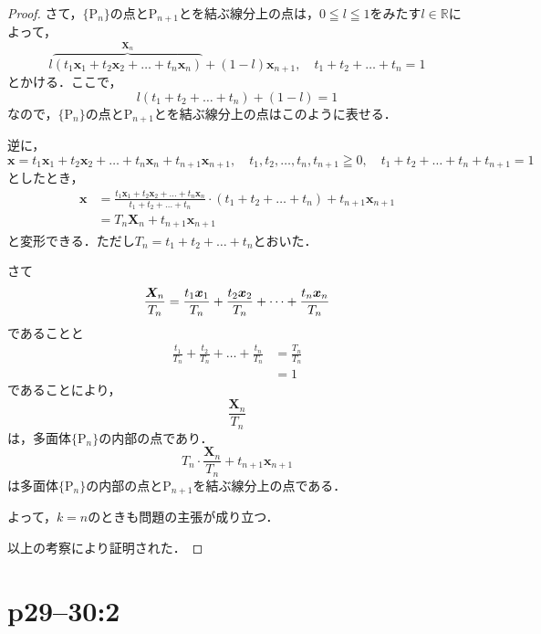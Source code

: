 \documentclass[a4paper,10pt,fleqn]{ltjsarticle}
\begin{document}
\begin{leftbar}
\begin{proof}
    さて，$\{ \mathrm{P}_n \}$の点と$\mathrm{P}_{n+1}$とを結ぶ線分上の点は，$ 0 \leqq l \leqq 1$をみたす$l \in \mathbb{R}$によって，
    \[
      l \overbrace{(  t_1 \bm{x}_1 + t_2 \bm{x}_2+\dots+ t_n \bm{x}_n)}^{\bm{X}_n}+(1-l) \bm{x}_{n+1} , \quad t_1+t_2+\dots + t_n =1
    \]
    とかける．ここで，
    \[
      l(t_1+t_2+\dots+t_n)+(1-l)=1
    \]
    なので，$\{ \mathrm{P}_n \}$の点と$\mathrm{P}_{n+1}$とを結ぶ線分上の点はこのように表せる．

    逆に，
    \[
      \bm{x} = t_1 \bm{x}_1 + t_2 \bm{x}_2 + \dots + t_n \bm{x}_n + t_{n+1} \bm{x}_{n+1} , \quad t_1, t_2 ,\dots , t_n,t_{n+1} \geqq 0 ,\quad  t_1 +t_2 + \dots+t_n + t_{n+1} =1
    \]
    としたとき，
    \begin{align*}
      \bm{x} & =\frac{t_1 \bm{x}_1 + t_2 \bm{x}_2+\dots+ t_n \bm{x}_n}{t_1+t_2+\dots+t_n} \cdot (t_1+t_2+\dots+t_n) +t_{n+1} \bm{x}_{n+1} \\
             & = T_n \bm{X}_n + t_{n+1} \bm{x}_{n+1}
    \end{align*}
    と変形できる．ただし$T_n = t_1 + t_2 +\dots+t_n$とおいた．

    さて
    \[
      \frac{\bm{X}_n }{T_n} = \frac{t_1 \bm{x}_1 }{T_n}+ \frac{t_2 \bm{x}_2 }{T_n}+\dots +  \frac{t_n \bm{x}_n }{T_n}  \\
    \]
    であることと
    \begin{align*}
      \frac{t_1}{T_n}+\frac{t_2 }{T_n} +\dots +\frac{t_n }{T_n} & = \frac{T_n}{T_n} \\
                                                                & = 1
    \end{align*}
    であることにより，
    \[
      \frac{\bm{X}_n}{T_n}
    \]
    は，多面体$\{ \mathrm{P}_n \}$の内部の点であり．
    \[
      T_n \cdot \frac{\bm{X}_n}{T_n} + t_{n+1} \bm{x}_{n+1}
    \]
    は多面体$\{ \mathrm{P}_n \}$の内部の点と$\mathrm{P}_{n+1}$を結ぶ線分上の点である．

    よって，$k=n$のときも問題の主張が成り立つ．

    以上の考察により証明された．
  \end{proof}
\end{leftbar}

\section*{p29--30:2}
\end{document}
